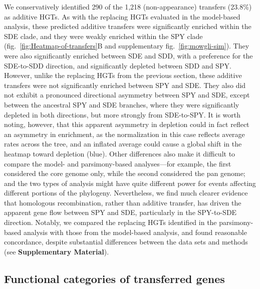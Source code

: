 \documentclass[12pt]{article}
\begin{document}
We conservatively identified 290 of the 1,218 (non-appearance) transfers
(23.8\%) as additive HGTs.  As with the replacing HGTs evaluated in the
model-based analysis, these predicted additive transfers were significantly
enriched within the SDE clade, and they were weakly enriched within the SPY
clade (fig.\ \ref{fig:Heatmap-of-transfers}B and
supplementary fig.\ \ref{fig:mowgli-sim}).
They were also
significantly enriched between SDE and SDD, with a preference for the
SDE-to-SDD direction, and significantly depleted between SDD and SPY.
However, unlike the replacing HGTs from the previous section, these
additive transfers were not significantly enriched between SPY and SDE.
They also did not exhibit a pronounced directional asymmetry between SPY
and SDE, except between the ancestral SPY and SDE branches, where they were
significantly depleted in both directions, but more strongly from
SDE-to-SPY.  It is worth noting, however, that this apparent asymmetry in
depletion could in fact reflect an asymmetry in enrichment, as the
normalization in this case reflects average rates across the tree, and an
inflated average could cause a global shift in the heatmap toward depletion
(blue).  Other differences also make it difficult to compare the model- and
parsimony-based analyses---for example, the first considered the core
genome only, while the second considered the pan genome; and the two types
of analysis might have quite different power for events affecting different
portions of the phylogeny.  Nevertheless, we find much clearer evidence
that homologous recombination, rather than additive transfer, has driven
the apparent gene flow between SPY and SDE, particularly in the SPY-to-SDE
direction.  Notably, we compared the replacing HGTs identified in the
parsimony-based analysis with those from the model-based analysis, and
found reasonable concordance, despite substantial differences between the
data sets and methods
(see \textbf{Supplementary Material}).

\subsection*{Functional categories of transferred genes}
\end{document}
